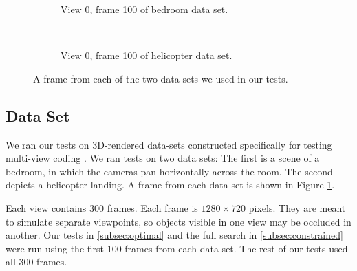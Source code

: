 \documentclass{sig-alternate-05-2015}
\begin{document}
\begin{figure}[H]
\centering
\begin{subfigure}{.5\textwidth}
\centering
{}
\caption{View 0, frame 100 of bedroom data set.}
\end{subfigure} \\
\begin{subfigure}{.5\textwidth}
\centering
{}
\caption{View 0, frame 100 of helicopter data set.}
\end{subfigure}
\caption{A frame from each of the two data sets we used in our tests.}
\label{fig:data-set}
\end{figure}

\newpage
\subsection{Data Set}
\label{subsec:data-set}
We ran our tests on 3D-rendered data-sets constructed specifically for testing
multi-view coding \cite{zhang:multi}. We ran tests on two data sets: The first
is a scene of a bedroom, in which the cameras pan horizontally across the room.
The second depicts a helicopter landing. A frame from each data set is shown in
Figure \ref{fig:data-set}.

Each view contains 300 frames. Each frame is $1280\times 720$ pixels. They are
meant to simulate separate viewpoints, so objects visible in one view may be
occluded in another. Our tests in \ref{subsec:optimal} and the full search in
\ref{subsec:constrained} were run using the first 100 frames from each data-set.
The rest of our tests used all 300 frames.
\end{document}

